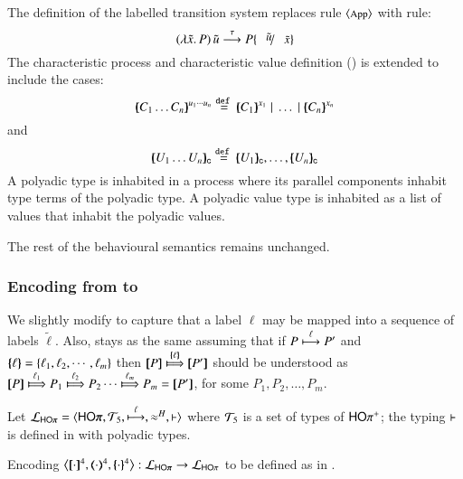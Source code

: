 \iftodo
{}
\else\fi

The definition of the labelled transition system
replaces rule ${\footnotesize \langle \textrm{App} \rangle}$ with rule:
%
\[
	\appl{(\abs{\tilde{x}} P)}{\tilde{u}} \by{\tau} P\subst{\tilde{u}}{\tilde{x}}
\]
%
The characteristic process and characteristic value 
definition ()
is extended to include the cases:
\[
	\mapchar{C_1 \dots C_n}{u_1 \cdots u_n} \defeq \mapchar{C_1}{x_1} \Par \dots \Par \mapchar{C_n}{x_n}
\]
\noi and
\[
	\omapchar{U_1 \dots U_n} \defeq \omapchar{U_1}, \dots, \omapchar{U_n}
\]
%
A polyadic type is inhabited in a process where its
parallel components inhabit type terms of the polyadic
type. A polyadic value type is inhabited as a list
of values that inhabit the polyadic values.

The rest of the behavioural semantics remains unchanged.


\subsubsection{Encoding from \pHOp to \HOp}

We slightly modify  to capture that a 
label $\ell$ may be mapped into a sequence of labels $\tilde{\ell}$.
Also,  stays as the same
assuming that if 
$P \stackrel{\ell}{\longmapsto} P'$ and $\{\!\!\{\ell\}\!\!\} = \{\ell_1, \ell_2,  \cdots, \ell_m\}$ then
$\map{P} \Hby{\mapa{\ell}} \map{P'}$
should be understood as
$\map{P} \Hby{\ell_1} P_1 \Hby{\ell_2} P_2 \cdots \Hby{\ell_m} P_m =  \map{P'}$,
for some
$P_1, P_2, \ldots, P_m$.

Let $\tyl{L}_{\pHOp}=\calc{\pHOp}{{\cal{T}}_5}{\hby{\ell}}{\wb}{\proves}$
where 
${\cal{T}}_5$ is a set of types of $\mathsf{HO}\pi^{\mathsf +}$;  
the typing $\vdash$ is defined in 
 with polyadic types.

\begin{definition}\rm
	\label{def:enc:pHOp_to_HOp}
	Encoding $\enco{\pmap{\cdot}{4}, \tmap{\cdot}{4}, \mapa{\cdot}^{4}}: \tyl{L}_{\pHOp} \to \tyl{L}_{\HOp}$
	to be defined as in .
\end{definition}

